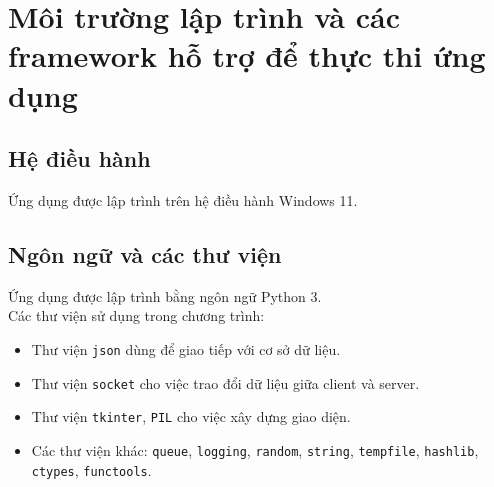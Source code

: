 \section{Môi trường lập trình và các framework hỗ trợ để thực thi ứng dụng}
\label{env}
\subsection{Hệ điều hành}
Ứng dụng được lập trình trên hệ điều hành Windows 11.
\subsection{Ngôn ngữ và các thư viện}
Ứng dụng được lập trình bằng ngôn ngữ Python 3.\\
Các thư viện sử dụng trong chương trình:
\begin{itemize}
\item Thư viện \texttt{json} dùng để giao tiếp với cơ sở dữ liệu.
\item Thư viện \texttt{socket} cho việc trao đổi dữ liệu giữa client và server.
\item Thư viện \texttt{tkinter}, \texttt{PIL} cho việc xây dựng giao diện.
\item Các thư viện khác: \texttt{queue}, \texttt{logging}, \texttt{random}, \texttt{string}, \texttt{tempfile}, \texttt{hashlib}, \texttt{ctypes}, \texttt{functools}.
\end{itemize}